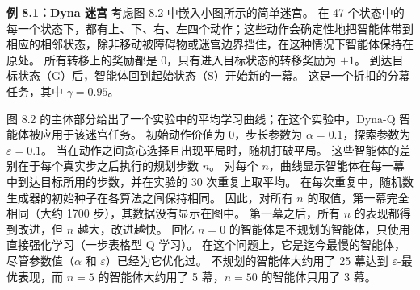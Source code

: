 \documentclass[UTF8, 12pt, fontset=fandol, oneside]{ctexart}
\begin{document}
\begin{center}
\end{center}

\noindent\textbf{例 8.1：Dyna 迷宫}
考虑图 8.2 中嵌入小图所示的简单迷宫。
在 47 个状态中的每一个状态下，都有上、下、右、左四个动作；这些动作会确定性地把智能体带到相应的相邻状态，除非移动被障碍物或迷宫边界挡住，在这种情况下智能体保持在原处。
所有转移上的奖励都是 0，只有进入目标状态的转移奖励为 $+1$。
到达目标状态（G）后，智能体回到起始状态（S）开始新的一幕。
这是一个折扣的分幕任务，其中 $\gamma=0.95$。

图 8.2 的主体部分给出了一个实验中的平均学习曲线；在这个实验中，Dyna-Q 智能体被应用于该迷宫任务。
初始动作价值为 0，步长参数为 $\alpha=0.1$，探索参数为 $\varepsilon=0.1$。
当在动作之间贪心选择且出现平局时，随机打破平局。
这些智能体的差别在于每个真实步之后执行的规划步数 $n$。
对每个 $n$，曲线显示智能体在每一幕中到达目标所用的步数，并在实验的 30 次重复上取平均。
在每次重复中，随机数生成器的初始种子在各算法之间保持相同。
因此，对所有 $n$ 的取值，第一幕完全相同（大约 1700 步），其数据没有显示在图中。
第一幕之后，所有 $n$ 的表现都得到改进，但 $n$ 越大，改进越快。
回忆 $n=0$ 的智能体是不规划的智能体，只使用直接强化学习（一步表格型 Q 学习）。
在这个问题上，它是迄今最慢的智能体，尽管参数值（$\alpha$ 和 $\varepsilon$）已经为它优化过。
不规划的智能体大约用了 25 幕达到 $\varepsilon$-最优表现，而 $n=5$ 的智能体大约用了 5 幕，$n=50$ 的智能体只用了 3 幕。
\end{document}
